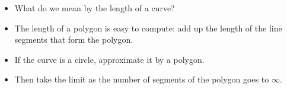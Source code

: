 \begin{frame}
\begin{center}
{}%
%
\end{center}
\begin{itemize}
\item  What do we mean by the length of a curve?
\item<2->  The length of a polygon is easy to compute: add up the length of the line segments that form the polygon.
\item<3->  If the curve is a circle, approximate it by a polygon.
\item<4->  Then take the limit as the number of segments of the polygon goes to $\infty$.
\end{itemize}
\end{frame}
